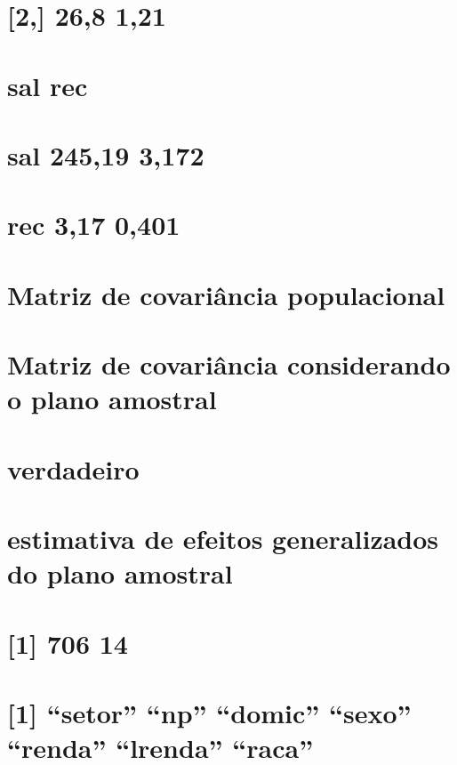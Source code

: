 \documentclass[]{book}
\theoremstyle{definition}
\theoremstyle{definition}
\theoremstyle{definition}
\theoremstyle{remark}
\begin{document}
\section{{[}2,{]} 26,8 1,21}\label{section-18}

\section{sal rec}\label{sal-rec-1}

\section{sal 245,19 3,172}\label{sal-24519-3172}

\section{rec 3,17 0,401}\label{rec-317-0401}

\section{Matriz de covariância
populacional}\label{matriz-de-covariancia-populacional}

\section{Matriz de covariância considerando o plano
amostral}\label{matriz-de-covariancia-considerando-o-plano-amostral}

\section{verdadeiro}\label{verdadeiro}

\section{estimativa de efeitos generalizados do plano
amostral}\label{estimativa-de-efeitos-generalizados-do-plano-amostral}

\section{{[}1{]} 706 14}\label{section-19}

\section{\texorpdfstring{{[}1{]} ``setor'' ``np'' ``domic'' ``sexo''
``renda'' ``lrenda''
``raca''}{{[}1{]} setor np domic sexo renda lrenda raca}}\label{setor-np-domic-sexo-renda-lrenda-raca}
\end{document}
